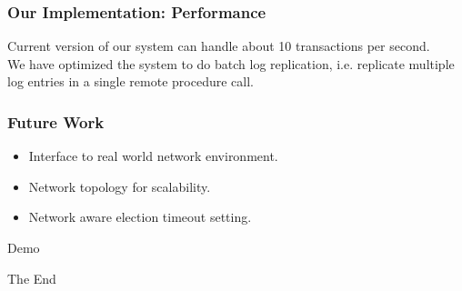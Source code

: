 \documentclass{beamer}
\begin{document}
\begin{frame}
\frametitle{Our Implementation: Performance}
Current version of our system can handle about 10 transactions per second.\\[1cm]

We have optimized the system to do batch log replication, i.e. replicate multiple log entries in a single remote procedure call.
\end{frame}


\begin{frame}
\frametitle{Future Work}
\begin{itemize}
\item Interface to real world network environment.
\item Network topology for scalability.
\item Network aware election timeout setting.
\end{itemize}
\end{frame}


\begin{frame}
\Huge{\centerline{Demo}}
\end{frame}

\begin{frame}
\Huge{\centerline{The End}}
\end{frame}

\end{document}
